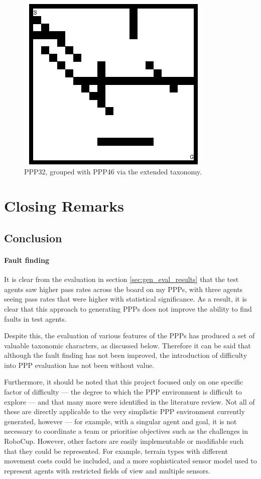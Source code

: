 \documentclass[authoryearcitations]{UoYCSproject}
\begin{document}
\begin{figure}[H]
\graphicspath{ {EvalPics/} }
\includegraphics[scale=0.65]{ppp32.png}
\caption{PPP32, grouped with PPP46 via the extended taxonomy.}
\label{fig:ppp_32}
\end{figure}


\part{Closing Remarks}
\label{sec:close}
\chapter{Conclusion}
\label{cha:conclusion}
\subsection{Fault finding}
\label{sec:conc_fault}
It is clear from the evaluation in section \ref{sec:gen_eval_results} that the test agents saw higher pass rates across the board on my PPPs, with three agents seeing pass rates that were higher with statistical significance. As a result, it is clear that this approach to generating PPPs does not improve the ability to find faults in test agents.

Despite this, the evaluation of various features of the PPPs has produced a set of valuable taxonomic characters, as discussed below. Therefore it can be said that although the fault finding has not been improved, the introduction of difficulty into PPP evaluation has not been without value.

Furthermore, it should be noted that this project focused only on one specific factor of difficulty --- the degree to which the PPP environment is difficult to explore --- and that many more were identified in the literature review. Not all of these are directly applicable to the very simplistic PPP environment currently generated, however --- for example, with a singular agent and goal, it is not necessary to coordinate a team or prioritise objectives such as the challenges in RoboCup. However, other factors are easily implementable or modifiable such that they could be represented. For example, terrain types with different movement costs could be included, and a more sophisticated sensor model used to represent agents with restricted fields of view and multiple sensors.
\end{document}
